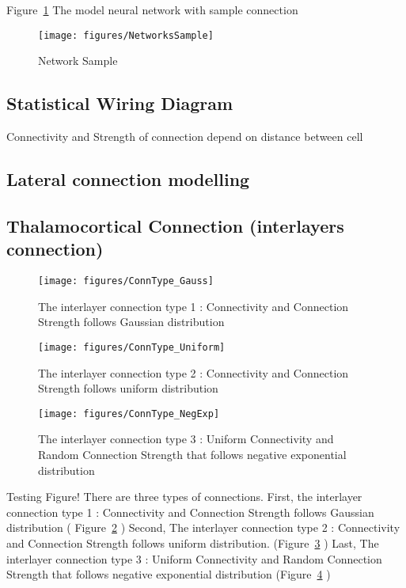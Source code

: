Figure~\ref{fig:NetSample} The model neural network with sample connection
\begin{figure}
	\centering
	\texttt{[image: figures/NetworksSample]}
	\label{fig:NetSample}
	\caption{Network Sample}
\end{figure}

\subsection{Statistical Wiring Diagram}
Connectivity and  Strength of connection depend on distance between cell~\cite{ringach2004haphazard,mclaughlin2000neuronal}


\subsection{Lateral connection modelling}



\subsection{Thalamocortical Connection (interlayers connection)}


\begin{figure}
	\centering
	\texttt{[image: figures/ConnType\_Gauss]}
	\label{fig:ConnGauss}
	\caption{The interlayer connection type 1 : Connectivity and Connection Strength follows Gaussian distribution}
\end{figure}


\begin{figure}
	\centering
	\texttt{[image: figures/ConnType\_Uniform]}
	\label{fig:ConnUniform}
	\caption{The interlayer connection type 2 : Connectivity and Connection Strength follows uniform distribution}
\end{figure}

\begin{figure}
	\centering
	\texttt{[image: figures/ConnType\_NegExp]}
	\label{fig:ConnNegExp}
	\caption{The interlayer connection type 3 : Uniform Connectivity and Random Connection Strength that follows negative exponential distribution}
\end{figure}


Testing Figure! There are three types of connections. First,   the interlayer connection type 1 : Connectivity and Connection Strength follows Gaussian distribution ( Figure~\ref{fig:ConnGauss} )
Second, The interlayer connection type 2 : Connectivity and Connection Strength follows uniform distribution. (Figure~\ref{fig:ConnUniform} ) 
Last, The interlayer connection type 3 : Uniform Connectivity and Random Connection Strength that follows negative exponential distribution (Figure~\ref{fig:ConnNegExp} )

